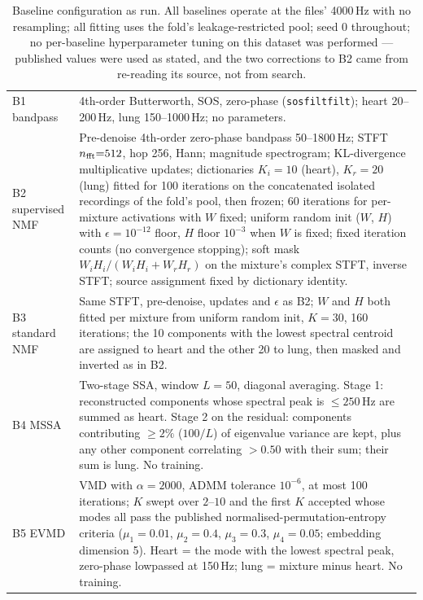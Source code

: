\documentclass[journal]{IEEEtran}
\begin{document}
\begin{table}[t]
\centering
\caption{Baseline configuration as run. All baselines operate at the files' 4000\,Hz with no resampling; all fitting uses the fold's leakage-restricted pool; seed 0 throughout; no per-baseline hyperparameter tuning on this dataset was performed --- published values were used as stated, and the two corrections to B2 came from re-reading its source, not from search.}
\label{pi:basecfg}
\scriptsize\setlength{\tabcolsep}{3pt}
\begin{tabular}{@{}lp{15.2cm}@{}}
\toprule
B1 bandpass & 4th-order Butterworth, SOS, zero-phase (\texttt{sosfiltfilt}); heart 20--200\,Hz, lung 150--1000\,Hz; no parameters. \\
B2 supervised NMF & Pre-denoise 4th-order zero-phase bandpass 50--1800\,Hz; STFT $n_{\rm fft}{=}512$, hop 256, Hann; magnitude spectrogram; KL-divergence multiplicative updates; dictionaries $K_i{=}10$ (heart), $K_r{=}20$ (lung) fitted for 100 iterations on the concatenated isolated recordings of the fold's pool, then frozen; 60 iterations for per-mixture activations with $W$ fixed; uniform random init ($W$, $H$) with $\epsilon{=}10^{-12}$ floor, $H$ floor $10^{-3}$ when $W$ is fixed; fixed iteration counts (no convergence stopping); soft mask $W_iH_i/(W_iH_i+W_rH_r)$ on the mixture's complex STFT, inverse STFT; source assignment fixed by dictionary identity. \\
B3 standard NMF & Same STFT, pre-denoise, updates and $\epsilon$ as B2; $W$ and $H$ both fitted per mixture from uniform random init, $K{=}30$, 160 iterations; the 10 components with the lowest spectral centroid are assigned to heart and the other 20 to lung, then masked and inverted as in B2. \\
B4 MSSA & Two-stage SSA, window $L{=}50$, diagonal averaging. Stage 1: reconstructed components whose spectral peak is $\leq 250$\,Hz are summed as heart. Stage 2 on the residual: components contributing $\geq 2\%$ ($100/L$) of eigenvalue variance are kept, plus any other component correlating $>0.50$ with their sum; their sum is lung. No training. \\
B5 EVMD & VMD with $\alpha{=}2000$, ADMM tolerance $10^{-6}$, at most 100 iterations; $K$ swept over $2$--$10$ and the first $K$ accepted whose modes all pass the published normalised-permutation-entropy criteria ($\mu_1{=}0.01$, $\mu_2{=}0.4$, $\mu_3{=}0.3$, $\mu_4{=}0.05$; embedding dimension 5). Heart = the mode with the lowest spectral peak, zero-phase lowpassed at 150\,Hz; lung = mixture minus heart. No training. \\

\end{tabular}
\end{table}
\end{document}
